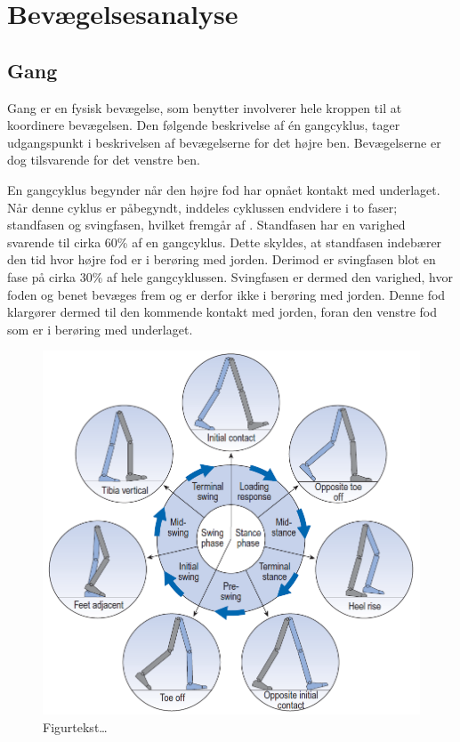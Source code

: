 \section{Bevægelsesanalyse}
%


\subsection{Gang}
Gang er en fysisk bevægelse, som benytter involverer hele kroppen til at koordinere bevægelsen. Den følgende beskrivelse af én gangcyklus, tager udgangspunkt i beskrivelsen af bevægelserne for det højre ben. Bevægelserne er dog tilsvarende for det venstre ben. \citep{VaughanDavisOConnor1992,Whittle1990}

En gangcyklus begynder når den højre fod har opnået kontakt med underlaget. Når denne cyklus er påbegyndt, inddeles cyklussen endvidere i to faser; standfasen og svingfasen, hvilket fremgår af . \newline
Standfasen har en varighed svarende til cirka 60\% af en gangcyklus. Dette skyldes, at standfasen indebærer den tid hvor højre fod er i berøring med jorden. Derimod er svingfasen blot en fase på cirka 30\% af hele gangcyklussen. \citep{VaughanDavisOConnor1992} Svingfasen er dermed den varighed, hvor foden og benet bevæges frem og er derfor ikke i berøring med jorden. Denne fod klargører dermed til den kommende kontakt med jorden, foran den venstre fod som er i berøring med underlaget.

\begin{figure}[H]
	\centering
	\includegraphics[scale=0.5]{figures/bProblemloesning/gang_cyklus2.png}
	\caption{Figurtekst…  \cite{VaughanDavisOConnor1992}}
	\label{fig:gang_cyklus}
\end{figure}
	
